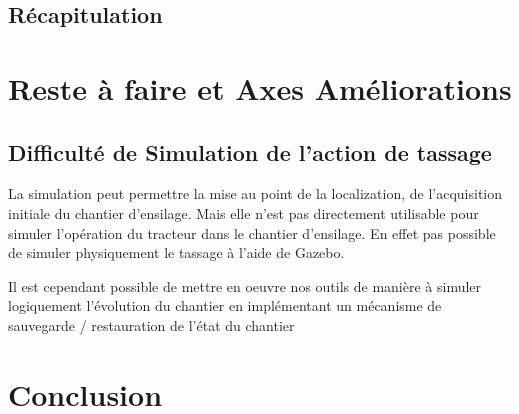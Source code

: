 \documentclass[12pt,a4paper]{report}
\begin{document}
	\section{Récapitulation}
	

\chapter{Reste à faire et Axes Améliorations}


\section{Difficulté de Simulation de l'action de tassage}
La simulation peut permettre la mise au point de la localization, de l'acquisition initiale du chantier d'ensilage. Mais elle n'est pas directement utilisable pour simuler l'opération du tracteur dans le chantier d'ensilage. En effet pas possible de simuler physiquement le tassage à l'aide de Gazebo.

\para Il est cependant possible de mettre en oeuvre nos outils de manière à simuler logiquement l'évolution du chantier en implémentant un mécanisme de sauvegarde / restauration de l'état du chantier



\chapter{Conclusion}
\end{document}

